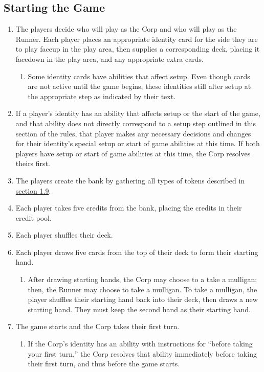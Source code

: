 \subsection{Starting the Game}
\begin{enumerate}
	\item The players decide who will play as the Corp and who will play as the Runner. Each player places an appropriate identity card for the side they are to play faceup in the play area, then supplies a corresponding deck, placing it facedown in the play area, and any appropriate extra cards.
	      \begin{enumerate}
		      \item Some identity cards have abilities that affect setup. Even though cards are not active until the game begins, these identities still alter setup at the appropriate step as indicated by their text.
	      \end{enumerate}
	\item If a player's identity has an ability that affects setup or the start of the game, and that ability does not directly correspond to a setup step outlined in this section of the rules, that player makes any necessary decisions and changes for their identity's special setup or start of game abilities at this time. If both players have setup or start of game abilities at this time, the Corp resolves theirs first.
	\item The players create the bank by gathering all types of tokens described in \hyperlink{page.i}{section 1.9}.
	\item Each player takes five credits from the bank, placing the credits in their credit pool.
	\item Each player shuffles their deck.
	\item Each player draws five cards from the top of their deck to form their starting hand.
	      \begin{enumerate}
		      \item After drawing starting hands, the Corp may choose to a take a mulligan; then, the Runner may choose to take a mulligan. To take a mulligan, the player shuffles their	starting hand back into their deck, then draws a new starting hand. They must keep the second hand as their starting hand.
	      \end{enumerate}
	\item The game starts and the Corp takes their first turn.
	      \begin{enumerate}
		      \item If the Corp's identity has an ability with instructions for ``before taking your first turn,'' the Corp resolves that ability immediately before taking their first turn, and thus before the game starts.
	      \end{enumerate}
\end{enumerate}
